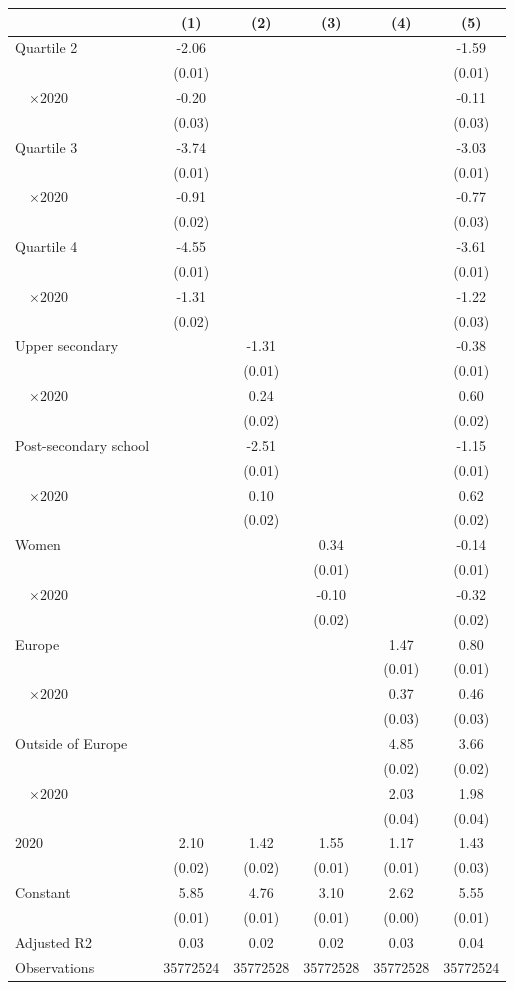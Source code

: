 
\begin{tabular}{@{}l*{5}{S[table-format={-}2.2{\tnote{***}}]}@{}}
\toprule
{} & {(1)} & {(2)} & {(3)} & {(4)} & {(5)}\tabularnewline%
\midrule
Quartile 2 & -2.06\tnote{***} &  &  &  & -1.59\tnote{***}\tabularnewline%
 & (0.01) &  &  &  & \vphantom{2} (0.01)\tabularnewline%
~~\(\times 2020\) & -0.20\tnote{***} &  &  &  & -0.11\tnote{***}\tabularnewline%
 & (0.03) &  &  &  & (0.03)\tabularnewline%
Quartile 3 & -3.74\tnote{***} &  &  &  & -3.03\tnote{***}\tabularnewline%
 & (0.01) &  &  &  & \vphantom{1} (0.01)\tabularnewline%
~~\(\times 2020\) & -0.91\tnote{***} &  &  &  & -0.77\tnote{***}\tabularnewline%
 & (0.02) &  &  &  & \vphantom{1} (0.03)\tabularnewline%
Quartile 4 & -4.55\tnote{***} &  &  &  & -3.61\tnote{***}\tabularnewline%
 & (0.01) &  &  &  & (0.01)\tabularnewline%
~~\(\times 2020\) & -1.31\tnote{***} &  &  &  & -1.22\tnote{***}\tabularnewline%
 & (0.02) &  &  &  & (0.03)\tabularnewline%
Upper secondary &  & -1.31\tnote{***} &  &  & -0.38\tnote{***}\tabularnewline%
 &  & (0.01) &  &  & \vphantom{1} (0.01)\tabularnewline%
~~\(\times 2020\) &  & 0.24\tnote{***} &  &  & 0.60\tnote{***}\tabularnewline%
 &  & (0.02) &  &  & \vphantom{1} (0.02)\tabularnewline%
Post-secondary school &  & -2.51\tnote{***} &  &  & -1.15\tnote{***}\tabularnewline%
 &  & (0.01) &  &  & (0.01)\tabularnewline%
~~\(\times 2020\) &  & 0.10\tnote{***} &  &  & 0.62\tnote{***}\tabularnewline%
 &  & (0.02) &  &  & (0.02)\tabularnewline%
Women &  &  & 0.34\tnote{***} &  & -0.14\tnote{***}\tabularnewline%
 &  &  & (0.01) &  & (0.01)\tabularnewline%
~~\(\times 2020\) &  &  & -0.10\tnote{***} &  & -0.32\tnote{***}\tabularnewline%
 &  &  & (0.02) &  & (0.02)\tabularnewline%
Europe &  &  &  & 1.47\tnote{***} & 0.80\tnote{***}\tabularnewline%
 &  &  &  & (0.01) & (0.01)\tabularnewline%
~~\(\times 2020\) &  &  &  & 0.37\tnote{***} & 0.46\tnote{***}\tabularnewline%
 &  &  &  & (0.03) & (0.03)\tabularnewline%
Outside of Europe &  &  &  & 4.85\tnote{***} & 3.66\tnote{***}\tabularnewline%
 &  &  &  & (0.02) & (0.02)\tabularnewline%
~~\(\times 2020\) &  &  &  & 2.03\tnote{***} & 1.98\tnote{***}\tabularnewline%
 &  &  &  & (0.04) & (0.04)\tabularnewline%
\midrule
\(2020\) & 2.10\tnote{***} & 1.42\tnote{***} & 1.55\tnote{***} & 1.17\tnote{***} & 1.43\tnote{***}\tabularnewline%
 & (0.02) & (0.02) & (0.01) & (0.01) & (0.03)\tabularnewline%
Constant & 5.85\tnote{***} & 4.76\tnote{***} & 3.10\tnote{***} & 2.62\tnote{***} & 5.55\tnote{***}\tabularnewline%
 & (0.01) & (0.01) & (0.01) & (0.00) & (0.01)\tabularnewline%
\midrule
Adjusted R2 & 0.03 & 0.02 & 0.02 & 0.03 & 0.04\tabularnewline%
Observations & {\num{35772524}} & {\num{35772528}} & {\num{35772528}} & {\num{35772528}} & {\num{35772524}}\tabularnewline%
\bottomrule
\end{tabular}
